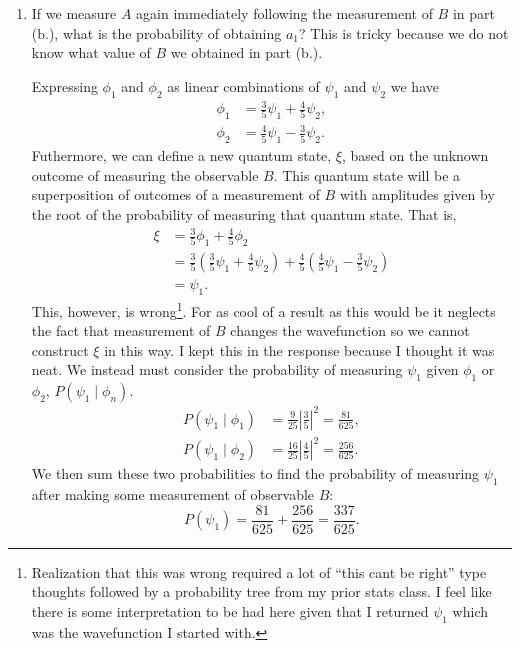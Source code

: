 \documentclass[a4paper, 12pt]{config/homework}
\begin{document}
\begin{enumerate}
\begin{enumerate}[label=(\alph*.)]
\item If we measure \(A\) again immediately following the measurement of \(B\) in part (b.), what is the probability of obtaining \(a_1\)? This is tricky because we do not know what value of \(B\) we obtained in part (b.).

Expressing \(\phi_1\) and \(\phi_2\) as linear combinations of \(\psi_1\) and \(\psi_2\) we have
\begin{align*}
\phi_1 &= \frac{3}{5}\psi_1 + \frac{4}{5}\psi_2, \\
\phi_2 &= \frac{4}{5}\psi_1 - \frac{3}{5}\psi_2.
\end{align*}
Futhermore, we can define a new quantum state, \(\xi \), based on the unknown outcome of measuring the observable \(B\). This quantum state will be a superposition of outcomes of a measurement of \(B\) with amplitudes given by the root of the probability of measuring that quantum state. That is,
\begin{align*}
\xi &= \frac{3}{5}\phi_1 + \frac{4}{5}\phi_2
\\&= \frac{3}{5}\left(\frac{3}{5}\psi_1 + \frac{4}{5}\psi_2\right) + \frac{4}{5}\left(\frac{4}{5}\psi_1 - \frac{3}{5}\psi_2\right)
\\&= \psi_1.
\end{align*}
This, however, is wrong\footnote{Realization that this was wrong required a lot of ``this cant be right'' type thoughts followed by a probability tree from my prior stats class. I feel like there is some interpretation to be had here given that I returned \(\psi_1\) which was the wavefunction I started with.}. For as cool of a result as this would be it neglects the fact that measurement of \(B\) changes the wavefunction so we cannot construct \(\xi \) in this way. I kept this in the response because I thought it was neat.
We instead must consider the probability of measuring \(\psi_1\) given \(\phi_1\) or \(\phi_2\), \(P\left(\psi_1 \mid \phi_n\right)\).
\begin{align*}
P\left(\psi_1 \mid \phi_1\right) &= \frac{9}{25}\left|\frac{3}{5}\right|^2 = \frac{81}{625}, \\
P\left(\psi_1 \mid \phi_2\right) &= \frac{16}{25}\left|\frac{4}{5}\right|^2 = \frac{256}{625}.
\end{align*}
We then sum these two probabilities to find the probability of measuring \(\psi_1\) after making some measurement of observable \(B\):
\[P(\psi_1) = \frac{81}{625} + \frac{256}{625} = \frac{337}{625}.\]

\end{enumerate}
\end{enumerate}
\end{document}
